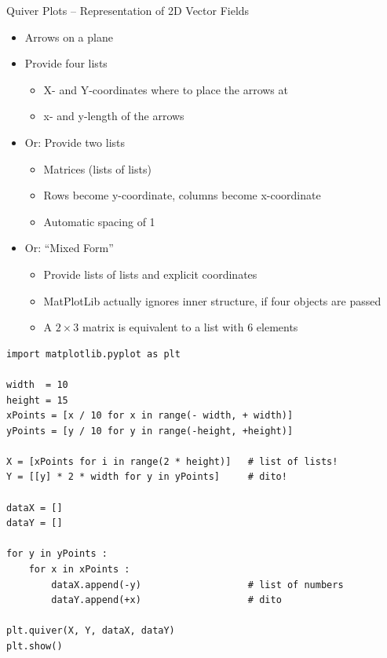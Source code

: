 \begin{frame}{Quiver Plots -- Representation of 2D Vector Fields}
%
\begin{itemize}
\item Arrows on a plane
\item Provide four lists
	\begin{itemize}
	\item X- and Y-coordinates where to place the arrows at
	\item x- and y-length of the arrows
	\end{itemize}
\item Or: Provide two lists
	\begin{itemize}
	\item Matrices (lists of lists)
	\item Rows become y-coordinate, columns become x-coordinate
	\item Automatic spacing of 1
	\end{itemize}
\item Or: \enquote{Mixed Form}
	\begin{itemize}
	\item Provide lists of lists and explicit coordinates
	\item MatPlotLib actually ignores inner structure, if four objects are passed
	\item A $2 \times 3$ matrix is equivalent to a list with 6 elements
	\end{itemize}
\end{itemize}
%
\end{frame}


\begin{frame}[fragile]
%
\begin{codebox}
\begin{verbatim}
import matplotlib.pyplot as plt

width  = 10
height = 15
xPoints = [x / 10 for x in range(- width, + width)]
yPoints = [y / 10 for y in range(-height, +height)]

X = [xPoints for i in range(2 * height)]   # list of lists!
Y = [[y] * 2 * width for y in yPoints]     # dito!

dataX = []
dataY = []

for y in yPoints :
    for x in xPoints :
        dataX.append(-y)                   # list of numbers
        dataY.append(+x)                   # dito

plt.quiver(X, Y, dataX, dataY)
plt.show()
\end{verbatim}
\end{codebox}
%
\end{frame}

